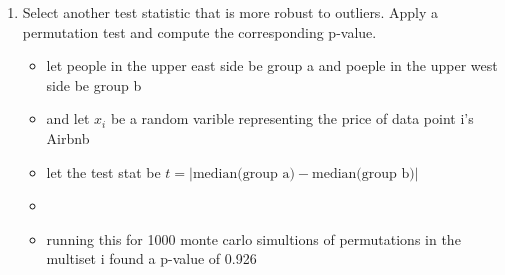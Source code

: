 \documentclass[12pt,twoside]{article}
\begin{document}
\begin{enumerate}
\begin{enumerate}
\item Select another test statistic that is more robust to outliers. Apply a permutation test and compute the corresponding p-value.
\begin{itemize}
  \color{blue}
  \item let people in the upper east side be group a and poeple in the upper west side be group b 
  \item and let $x_i$ be a random varible representing the price of data point i's Airbnb
  \item let the test stat be $t=|\text{median(group a)}-\text{median(group b)}|$
    \item \inputminted[firstline=126, lastline=143, breaklines=True]{python}{hw7.py}
  \item running this for 1000 monte carlo simultions of permutations in the multiset i found a p-value of 0.926
 
\end{itemize}

\end{enumerate}
\end{enumerate}
\end{document}
